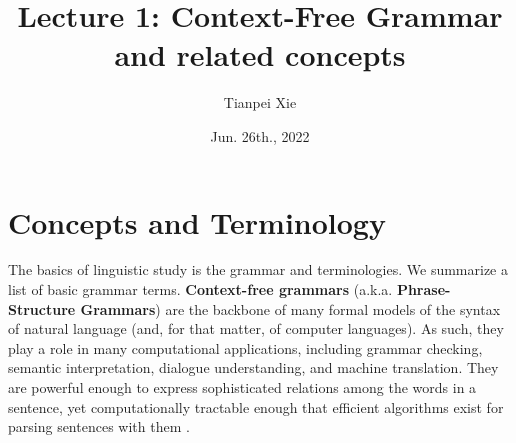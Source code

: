\documentclass[11pt]{article}
\begin{document}
\title{Lecture 1: Context-Free Grammar and related concepts}
\author{ Tianpei Xie}
\date{ Jun. 26th., 2022 }
\maketitle
\tableofcontents
\newpage
\allowdisplaybreaks
\section{Concepts and Terminology}
The basics of linguistic study is the grammar and terminologies. We summarize a list of basic grammar terms. \textbf{Context-free grammars} (a.k.a. \textbf{Phrase-Structure Grammars}) are the backbone of many formal models of the syntax of natural language (and, for that matter, of computer languages). As such, they play a role in many computational applications, including grammar checking, semantic interpretation, dialogue understanding, and machine translation. They are powerful enough to express sophisticated relations among the words in a sentence, yet computationally tractable enough that efficient algorithms exist for parsing sentences with them \citep{jurafsky2014speech}.
\end{document}
